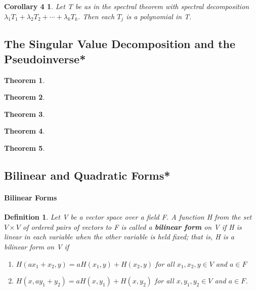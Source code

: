 \documentclass{article}
\newcommand{\bd}[1]{\textbf{#1}}
\newcommand{\enumalph}[0]{\begin{enumerate}[label=(\alph*)]}
\theoremstyle{plain}
\newtheorem{theorem}{Theorem}[section]
\newtheorem*{corollary4}{Corollary 4}
\newtheorem*{definition1}{Definition}
\theoremstyle{plain} %
\begin{document}
\begin{corollary4}
  Let T be as in the spectral theorem with spectral decomposition $\lambda_1T_1 + \lambda_2T_2 + \cdots + \lambda_kT_k$. Then each $T_j$ is a polynomial in T.
\end{corollary4}

\subsection{The Singular Value Decomposition and the Pseudoinverse*}

\begin{theorem}
  
\end{theorem}

\begin{theorem}
  
\end{theorem}

\begin{theorem}
  
\end{theorem}

\begin{theorem}
  
\end{theorem}

\begin{theorem}
  
\end{theorem}

\subsection{Bilinear and Quadratic Forms*}

\paragraph{Bilinear Forms}

\begin{definition1}
  Let V be a vector space over a field F. A function H from the set $V \times V$ of ordered pairs of vectors to F is called a \bd{bilinear form} on V if H is linear in each variable when the other variable is held fixed; that is, H is a bilinear form on V if
  \enumalph
  \item $H(ax_1 + x_2, y) = aH(x_1, y) + H(x_2, y)$ for all $x_1, x_2, y \in V$ and $a \in F$
  \item $H(x, ay_1 + y_2) = aH(x, y_1) + H(x, y_2)$ for all $x, y_1, y_2 \in V$ and $a \in F$.
  \end{enumerate}
\end{definition1}
\end{document}
